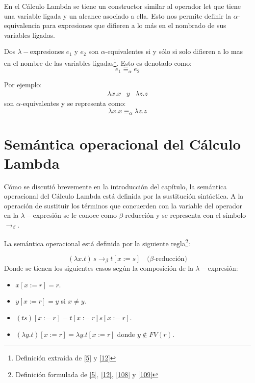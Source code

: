     En el Cálculo Lambda se tiene un constructor similar al operador \textsf{let} que tiene una variable ligada y un alcance asociado a ella. Esto nos permite definir la $\alpha$-equivalencia para expresiones que difieren a lo más en el nombrado de sus variables ligadas. 
    \begin{definition}  Dos $\lambda-$expresiones $e_1$ y $e_2$ son $\alpha$-equivalentes si y sólo si solo difieren a lo mas en el nombre de las variables ligadas\footnote{Definición extraída de  \hyperlink{5}{[5]}  y  \hyperlink{12}{[12]}}. Esto es denotado como: $$e_1 \equiv_{\alpha} e_2 $$

     Por ejemplo:
    \[
        \begin{array}{ccc}
        \lambda x.x & y & \lambda z.z
        \end{array}
    \]
    \noindent
    son $\alpha$-equivalentes y se representa como: $$\lambda x.x\equiv_{\alpha}\lambda z.z$$
    \end{definition}


    \section{Semántica operacional del Cálculo Lambda}
    Cómo se discutió brevemente en la introducción del capítulo, la semántica operacional del Cálculo Lambda está definida por la sustitución sintáctica. 
A la operación de sustituir los términos que concuerden con la variable del operador en la $\lambda-$expresión se le conoce como $\beta$-reducción y se representa con el símbolo $\to_\beta$. 


    \begin{definition} La semántica operacional está definida por la siguiente regla\footnote{Definición formulada de \hyperlink{5}{[5]},  \hyperlink{12}{[12]},  \hyperlink{108}{[108]} y  \hyperlink{109}{[109]}}: 

    $$(\lambda x.t)\,s \to_\beta t[x:=s] \quad \text{($\beta$-reducción)}$$
    Donde se tienen los siguientes casos según la composición de la $\lambda-$expresión:\\
        \begin{itemize}
        \item $x[x:=r] = r$. 
        \item $y[x:=r] = y$ si $x\neq y$.
        \item $(ts)[x:=r] = t[x:=r]s[x:=r]$.
        \item $(\lambda y.t)[x:=r] = \lambda y.t[x:=r]$ donde $y\notin FV(r)$.
        \end{itemize}
	\bigskip
    \end{definition}

